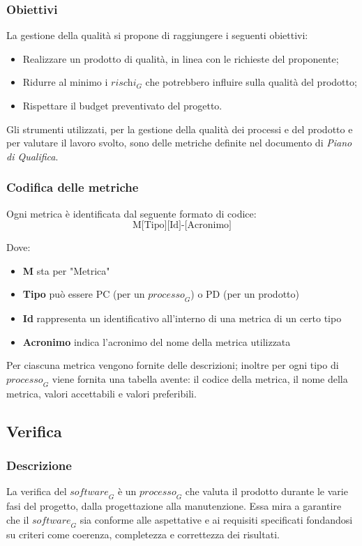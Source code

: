 \subsubsection{Obiettivi}
La gestione della qualità si propone di raggiungere i seguenti obiettivi:
\begin{itemize}
    \item Realizzare un prodotto di qualità, in linea con le richieste del proponente;
    \item Ridurre al minimo i $\textit{rischi}_G$ che potrebbero influire sulla qualità del prodotto;
    \item Rispettare il budget preventivato del progetto.
\end{itemize}
Gli strumenti utilizzati, per la gestione della qualità dei processi e del prodotto e per valutare il lavoro svolto, sono delle metriche definite nel documento di \emph{Piano di Qualifica}. 
\subsubsection{Codifica delle metriche}
Ogni metrica è identificata dal seguente formato di codice:
\[
\text{M[Tipo][Id]-[Acronimo]}
\]

Dove:
\begin{itemize}
    \item \textbf{M} sta per "Metrica"
    \item \textbf{Tipo} può essere PC (per un $\textit{processo}_G$) o PD (per un prodotto)
    \item \textbf{Id} rappresenta un identificativo all'interno di una metrica di un certo tipo
    \item \textbf{Acronimo} indica l'acronimo del nome della metrica utilizzata
\end{itemize}
Per ciascuna metrica vengono fornite delle descrizioni; inoltre per ogni tipo di $\textit{processo}_G$ viene fornita una tabella avente: il codice della metrica, il nome della metrica, valori accettabili e valori preferibili.

\subsection{Verifica}
\subsubsection{Descrizione}
La verifica del $\textit{software}_G$ è un $\textit{processo}_G$ che valuta il prodotto durante le varie fasi del progetto, dalla progettazione alla manutenzione. Essa mira a garantire che il $\textit{software}_G$ sia conforme alle aspettative e ai requisiti specificati fondandosi su criteri come coerenza, completezza e correttezza dei risultati.
